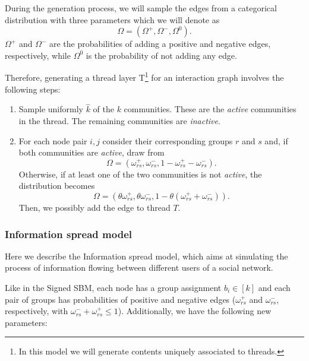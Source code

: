 During the generation process, we will sample the edges from a categorical
distribution with three parameters which we will denote as
\begin{equation*}
	\Omega = (\Omega^+, \Omega ^-, \Omega ^0).
\end{equation*}
$\Omega ^+$ and $\Omega ^-$ are the probabilities of adding a positive and
negative edges, respectively, while $\Omega ^0$ is the probability of not
adding any edge.

\bigskip

Therefore, generating a thread layer T\footnote{In this model we will generate
	contents uniquely associated to threads.} for an interaction graph
involves the following steps:
\begin{enumerate}
	\item Sample uniformly $\hat{k}$ of the $k$ communities. These are the
	      \emph{active} communities in the thread. The remaining communities
	      are \emph{inactive}.
	\item For each node pair $i, j$ consider their corresponding groups $r$ and
	      $s$ and, if both communities are \emph{active},
	      draw from
	      \begin{equation*}
		      \Omega = (\omega _{rs} ^{+}, \omega _{rs} ^{-}, 1 - \omega _{rs}
		      ^{+} - \omega _{rs} ^{-}).
	      \end{equation*}
	      Otherwise, if at least one of the
	      two communities is not \emph{active}, the distribution becomes
	      \begin{equation*}
		      \Omega = (\theta \omega _{rs} ^{+}, \theta \omega _{rs} ^{-}, 1 - \theta
		      (\omega _{rs} ^{+} + \omega _{rs} ^{-})).
	      \end{equation*}
	      Then, we possibly add the edge to thread $T$.

\end{enumerate}

\subsubsection{Information spread model}%
\label{ssub:information_spread_model}

Here we describe the Information spread model, which aims at simulating the
process of information flowing between different users of a social network.

Like in the Signed SBM, each node has a group assignment $b_i \in [k]$ and
each pair of groups has probabilities of
positive and negative edges ($\omega _{rs}^{+}  $ and $\omega _{rs}^{-}  $,
respectively, with $\omega ^{-} _{rs} + \omega ^{+} _{rs}
	\leq 1$).
Additionally, we have the following new parameters:

